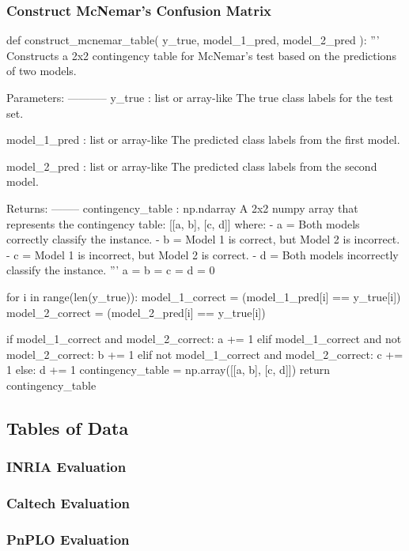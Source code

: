 \subsubsection{Construct McNemar's Confusion Matrix}\label{appendix:mcnemar}
\begin{pythoncode}
def construct_mcnemar_table(
        y_true,
        model_1_pred,
        model_2_pred
):
    '''
    Constructs a 2x2 contingency table for McNemar's test based on the predictions of two models.

    Parameters:
    -----------
    y_true : list or array-like
        The true class labels for the test set.

    model_1_pred : list or array-like
        The predicted class labels from the first model.

    model_2_pred : list or array-like
        The predicted class labels from the second model.

    Returns:
    --------
    contingency_table : np.ndarray
        A 2x2 numpy array that represents the contingency table:
            [[a, b], [c, d]]
        where:
        - a = Both models correctly classify the instance.
        - b = Model 1 is correct, but Model 2 is incorrect.
        - c = Model 1 is incorrect, but Model 2 is correct.
        - d = Both models incorrectly classify the instance.
    '''
    a = b = c = d = 0

    for i in range(len(y_true)):
        model_1_correct = (model_1_pred[i] == y_true[i])
        model_2_correct = (model_2_pred[i] == y_true[i])

        if model_1_correct and model_2_correct:
            a += 1
        elif model_1_correct and not model_2_correct:
            b += 1
        elif not model_1_correct and model_2_correct:
            c += 1
        else:
            d += 1
    contingency_table = np.array([[a, b], [c, d]])
    return contingency_table

\end{pythoncode}

\subsection{Tables of Data}
\subsubsection{INRIA Evaluation}
\subsubsection{Caltech Evaluation}
\subsubsection{PnPLO Evaluation}
